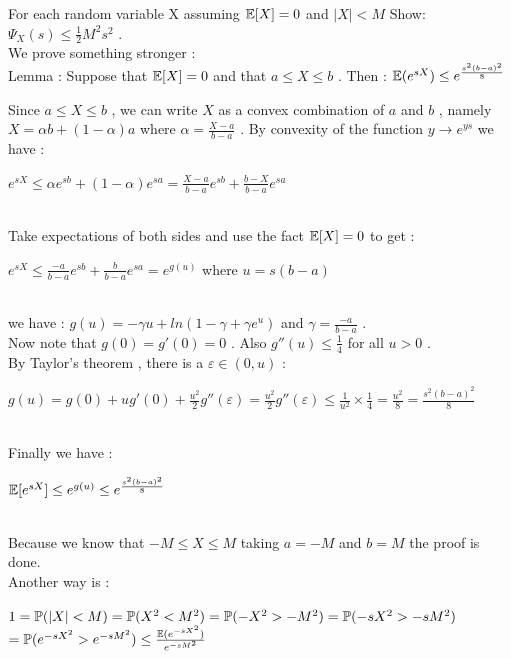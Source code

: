 \documentclass[30pt]{article}
\begin{document}
{\color{blue}{\large 2.} For each random variable X assuming $\Bbb{E}[X] = 0 $ and $|X| < M $ Show: \hspace{1cm} $\Psi_X(s) \le \frac{1}{2}M^2s^2 $ . } \\ 
We prove something stronger : \\
{\color{BrickRed}Lemma :  Suppose that $\Bbb{E}[X] = 0 $ and that $a \le X \le b$ . Then : \hspace{1cm} $\Bbb{E}(e^{sX}) \le e^{\frac{s^2(b-a)^2}{8}} $ } \vspace{0.5cm} \\

{\color{Maroon} Since $a \le X \le b$ , we can write $X$ as a convex combination of $a$ and $b$ , namely $X = \alpha b + (1 - \alpha )a$ where $\alpha = \frac{X - a}{b - a} $ . By convexity of the function $y \rightarrow e^{ys} $ we have : \\
\begin{center}
    $e^{sX} \le \alpha e^{sb} + (1 - \alpha)e^{sa} = \frac{X - a}{b - a}e^{sb} + \frac{b - X}{b-a}e^{sa} $
\end{center} \\
Take expectations of both sides and use the fact $\Bbb{E}[X] = 0 $ to get : \\
\begin{center}
     $e^{sX} \le \frac{ - a}{b - a}e^{sb} + \frac{b }{b-a}e^{sa} = e^{g(u)} $ \hspace{0.5cm} where $u = s(b - a) $
\end{center} \\
we have : $g(u) = -\gamma u + ln(1 - \gamma + \gamma e^u ) $ and $\gamma = \frac{-a}{b - a} $ . \\
Now note that $g(0) = g'(0) = 0 $ . Also $g''(u) \le \frac{1}{4}$ for all $u > 0 $ . \\
By Taylor's theorem , there is a  $\varepsilon \in (0,u) $  : \\
\begin{center}
    $g(u) = g(0) + ug'(0) + \frac{u^2}{2} g''(\varepsilon) = \frac{u^2}{2} g''(\varepsilon) \le \frac{1}{u^2} \times \frac{1}{4} = \frac{u^2}{8} = \frac{s^2(b-a)^2}{8} $ 
\end{center} \\
Finally we have : \\
\begin{center}
    $\Bbb{E}[e^{sX}] \le e^{g(u)} \le e^{\frac{s^2(b-a)^2}{8}} $
\end{center} } \\ 
Because we know that $-M \le X \le M $ taking $a = -M $ and $b = M$ the proof is done. \\ \newline
Another way is : \\ 
\begin{center}
    $1 = \Bbb{P}(|X| < M) = \Bbb{P}(X^2 < M^2) = \Bbb{P}(-X^2 > -M^2) =\Bbb{P}(-sX^2 > -sM^2)$  \vspace{0.3cm} \\
    $= \Bbb{P}(e^{-sX^2} > e^{-sM^2}) \le \frac{\Bbb{E}(e^{-sX^2})}{e^{-sM^2}} $
\end{center}
\end{document}
